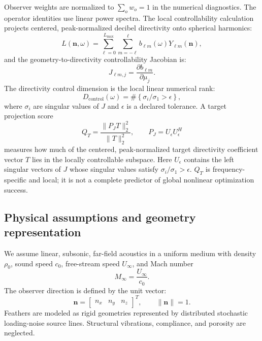 \documentclass[11pt]{article}
\newcommand{\vect}[1]{\bm{#1}}
\begin{document}
Observer weights are normalized to $\sum_o w_o=1$ in the numerical diagnostics. The operator identities use linear power spectra. The local controllability calculation projects centered, peak-normalized decibel directivity onto spherical harmonics:
\begin{equation}
    L(\vect{n},\omega)
    =
    \sum_{\ell=0}^{L_{\max}}
    \sum_{m=-\ell}^{\ell}
    b_{\ell m}(\omega)
    Y_{\ell m}(\vect{n}),
\label{eq:spherical_directivity}
\end{equation}
and the geometry-to-directivity controllability Jacobian is:
\begin{equation}
    J_{\ell m,j}
    =
    \frac{\partial b_{\ell m}}{\partial \mu_j}.
\label{eq:controllability_jacobian}
\end{equation}
The directivity control dimension is the local linear numerical rank:
\begin{equation}
    D_{\mathrm{control}}(\omega)
    =
    \#\left\{
        \sigma_i/\sigma_1>\epsilon
    \right\},
\label{eq:control_dimension}
\end{equation}
where $\sigma_i$ are singular values of $J$ and $\epsilon$ is a declared tolerance. A target projection score
\begin{equation}
    Q_T
    =
    \frac{\|P_JT\|_2^2}{\|T\|_2^2},
    \qquad
    P_J=U_\epsilon U_\epsilon^H
\label{eq:target_projection}
\end{equation}
measures how much of the centered, peak-normalized target directivity coefficient vector $T$ lies in the locally controllable subspace. Here $U_\epsilon$ contains the left singular vectors of $J$ whose singular values satisfy $\sigma_i/\sigma_1>\epsilon$. $Q_T$ is frequency-specific and local; it is not a complete predictor of global nonlinear optimization success.

\subsection{Physical assumptions and geometry representation}

We assume linear, subsonic, far-field acoustics in a uniform medium with density $\rho_0$, sound speed $c_0$, free-stream speed $U_\infty$, and Mach number
\begin{equation}
    M_\infty = \frac{U_\infty}{c_0}.
\label{eq:mach}
\end{equation}
The observer direction is defined by the unit vector:
\begin{equation}
    \vect{n} =
    \begin{bmatrix}
    n_x & n_y & n_z
    \end{bmatrix}^{T},
    \qquad
    \|\vect{n}\| = 1.
\end{equation}
Feathers are modeled as rigid geometries represented by distributed stochastic loading-noise source lines. Structural vibrations, compliance, and porosity are neglected.
\end{document}
